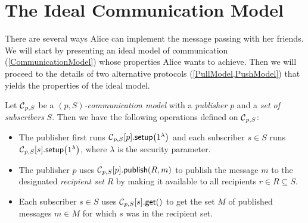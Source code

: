 %
%
\section{The Ideal Communication Model}\label{IdealCommunication}

There are several ways Alice can implement the message passing with her 
friends.
We will start by presenting an ideal model of communication 
(\cref{CommunicationModel}) whose properties Alice wants to achieve.
Then we will proceed to the details of two alternative protocols 
(\cref{PullModel,PushModel}) that yields the properties of the ideal model.

\begin{definition}\label{CommunicationModel}
  Let \(\C[p, S]\) be a \emph{\((p, S)\)-communication model} with 
  a \emph{publisher} \(p\) and a \emph{set of subscribers} \(S\).
  Then we have the following operations defined on \(\C[p, S]\):
  \begin{itemize}
    \item The publisher first runs \(\csetup[p, S]{p}[1^\lambda]\) and each 
      subscriber \(s\in S\) runs \(\csetup[p, S]{s}[1^\lambda]\), where 
      \(\lambda\) is the security parameter.
    \item The publisher \(p\) uses \(\cpub[p, S]{p}[R][m]\) to publish the 
      message \(m\) to the designated \emph{recipient set} \(R\) by making it 
      available to all recipients \(r\in R\subseteq S\).
    \item Each subscriber \(s\in S\) uses \(\cget[p, S]{s}[]\) to get the set 
      \(M\) of published messages \(m\in M\) for which \(s\) was in the 
      recipient set.
  \end{itemize}
\end{definition}

